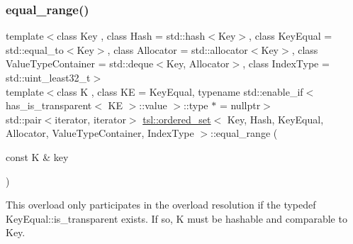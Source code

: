 \subsubsection{\texorpdfstring{equal\_range()}{equal\_range()}\hspace{0.1cm}{\footnotesize\ttfamily [3/6]}}
{\footnotesize\ttfamily template$<$class Key , class Hash  = std\+::hash$<$\+Key$>$, class Key\+Equal  = std\+::equal\+\_\+to$<$\+Key$>$, class Allocator  = std\+::allocator$<$\+Key$>$, class Value\+Type\+Container  = std\+::deque$<$\+Key, Allocator$>$, class Index\+Type  = std\+::uint\+\_\+least32\+\_\+t$>$ \\
template$<$class K , class KE  = Key\+Equal, typename std\+::enable\+\_\+if$<$ has\+\_\+is\+\_\+transparent$<$ K\+E $>$\+::value $>$\+::type $\ast$  = nullptr$>$ \\
std\+::pair$<$iterator, iterator$>$ \mbox{\hyperlink{classtsl_1_1ordered__set}{tsl\+::ordered\+\_\+set}}$<$ Key, Hash, Key\+Equal, Allocator, Value\+Type\+Container, Index\+Type $>$\+::equal\+\_\+range (\begin{DoxyParamCaption}\item[{const K \&}]{key }\end{DoxyParamCaption})\hspace{0.3cm}{\ttfamily [inline]}}

This overload only participates in the overload resolution if the typedef Key\+Equal\+::is\+\_\+transparent exists. If so, K must be hashable and comparable to Key. \mbox{\label{classtsl_1_1ordered__set_a80cd49bbc9a568fe78c14e7d80b81c9c}} 
